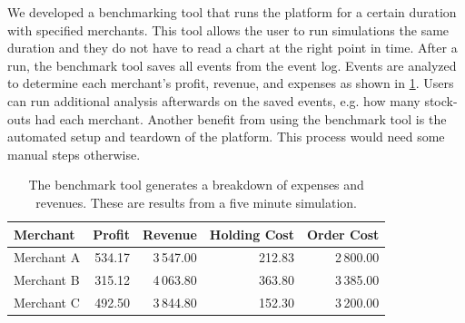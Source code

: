 We developed a benchmarking tool that runs the \pricewars platform for a certain duration with specified merchants.
This tool allows the user to run simulations the same duration and they do not have to read a chart at the right point in time.
After a run, the benchmark tool saves all events from the event log.
Events are analyzed to determine each merchant's profit, revenue, and expenses as shown in \cref{tab:benchmark_tool}.
Users can run additional analysis afterwards on the saved events, e.g. how many stock-outs had each merchant.
Another benefit from using the benchmark tool is the automated setup and teardown of the platform.
This process would need some manual steps otherwise.

\begin{table}[t]
\centering
\begin{tabular}{ lrrrr }
	\toprule
	Merchant & Profit & Revenue & Holding Cost & Order Cost \\
	\midrule
	Merchant A & 534.17 & 3\,547.00 & 212.83 & 2\,800.00 \\
	Merchant B & 315.12 & 4\,063.80 & 363.80 & 3\,385.00 \\
	Merchant C & 492.50 & 3\,844.80 & 152.30 & 3\,200.00 \\
	\bottomrule
\end{tabular}
\caption{The benchmark tool generates a breakdown of expenses and revenues. These are results from a five minute simulation.}
\label{tab:benchmark_tool}
\end{table}

